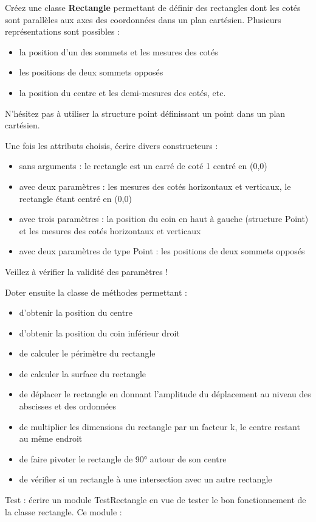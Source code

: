 {
{Créez une classe
}{\textbf{Rectangle}}{
permettant de définir des rectangles dont les cotés sont parallèles aux
axes des coordonnées dans un plan cartésien. Plusieurs représentations
sont possibles : }}

\liststyleListi
\begin{itemize}
\item {
la position d’un des sommets et les mesures des cotés}
\item {
les positions de deux sommets opposés}
\item {
la position du centre et les demi-mesures des cotés, etc.}
\end{itemize}
{
N’hésitez pas à utiliser la structure point définissant un point dans un
plan cartésien.}

{
Une fois les attributs choisis, écrire divers constructeurs :}

\liststyleListi
\begin{itemize}
\item {
sans arguments : le rectangle est un carré de coté 1 centré en (0,0)}
\item {
avec deux paramètres : les mesures des cotés horizontaux et verticaux,
le rectangle étant centré en (0,0)}
\item {
avec trois paramètres : la position du coin en haut à gauche (structure
Point) et les mesures des cotés horizontaux et verticaux }
\item {
avec deux paramètres de type Point : les positions de deux sommets
opposés}
\end{itemize}
{
Veillez à vérifier la validité des paramètres !}

{
Doter ensuite la classe de méthodes permettant :}

\liststyleListi
\begin{itemize}
\item {
d’obtenir la position du centre}
\item {
d’obtenir la position du coin inférieur droit}
\item {
de calculer le périmètre du rectangle}
\item {
de calculer la surface du rectangle}
\item {
de déplacer le rectangle en donnant l’amplitude du déplacement au niveau
des abscisses et des ordonnées}
\item {
de multiplier les dimensions du rectangle par un facteur k, le centre
restant au même endroit}
\item {
de faire pivoter le rectangle de 90° autour de son centre}
\item {
de vérifier si un rectangle à une intersection avec un autre rectangle}
\end{itemize}
{
Test : écrire un module TestRectangle en vue de tester le bon
fonctionnement de la classe rectangle. Ce module : }

